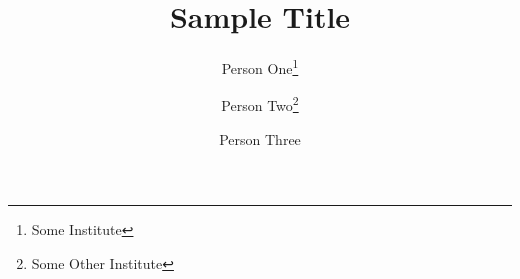 \documentclass{article}
\begin{document}
\author{Person One\thanks{Some Institute} \and
Person Two\thanks{Some Other Institute} \and
Person Three\footnotemark[1]}

\title{Sample Title}

\maketitle
\end{document}
